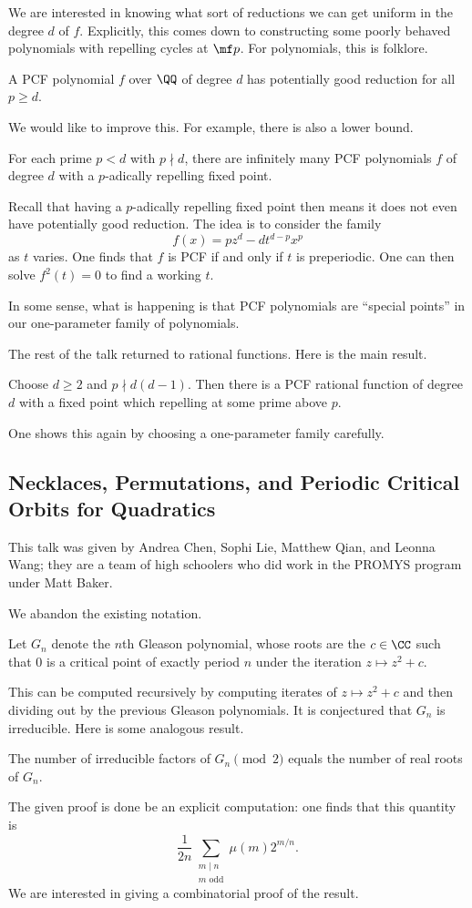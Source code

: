 \documentclass{article}
\begin{document}
We are interested in knowing what sort of reductions we can get uniform in the degree $d$ of $f$. Explicitly, this comes down to constructing some poorly behaved polynomials with repelling cycles at $\mf p$. For polynomials, this is folklore.
\begin{proposition}
	A PCF polynomial $f$ over $\QQ$ of degree $d$ has potentially good reduction for all $p\ge d$.
\end{proposition}
We would like to improve this. For example, there is also a lower bound.
\begin{proposition}
	For each prime $p<d$ with $p\nmid d$, there are infinitely many PCF polynomials $f$ of degree $d$ with a $p$-adically repelling fixed point.
\end{proposition}
Recall that having a $p$-adically repelling fixed point then means it does not even have potentially good reduction. The idea is to consider the family
\[f(x)=pz^d-dt^{d-p}x^p\]
as $t$ varies. One finds that $f$ is PCF if and only if $t$ is preperiodic. One can then solve $f^2(t)=0$ to find a working $t$.
\begin{remark}
	In some sense, what is happening is that PCF polynomials are ``special points'' in our one-parameter family of polynomials.
\end{remark}
The rest of the talk returned to rational functions. Here is the main result.
\begin{theorem}
	Choose $d\ge2$ and $p\nmid d(d-1)$. Then there is a PCF rational function of degree $d$ with a fixed point which repelling at some prime above $p$.
\end{theorem}
One shows this again by choosing a one-parameter family carefully.

\subsection{Necklaces, Permutations, and Periodic Critical Orbits for Quadratics}
This talk was given by Andrea Chen, Sophi Lie, Matthew Qian, and Leonna Wang; they are a team of high schoolers who did work in the PROMYS program under Matt Baker.

We abandon the existing notation.
\begin{definition}
	Let $G_n$ denote the $n$th Gleason polynomial, whose roots are the $c\in\CC$ such that $0$ is a critical point of exactly period $n$ under the iteration $z\mapsto z^2+c$.
\end{definition}
This can be computed recursively by computing iterates of $z\mapsto z^2+c$ and then dividing out by the previous Gleason polynomials. It is conjectured that $G_n$ is irreducible. Here is some analogous result.
\begin{theorem}
	The number of irreducible factors of $G_n\pmod2$ equals the number of real roots of $G_n$.
\end{theorem}
The given proof is done be an explicit computation: one finds that this quantity is
\[\frac1{2n}\sum_{\substack{m\mid n\\m\text{ odd}}}\mu(m)2^{m/n}.\]
We are interested in giving a combinatorial proof of the result.
\end{document}
